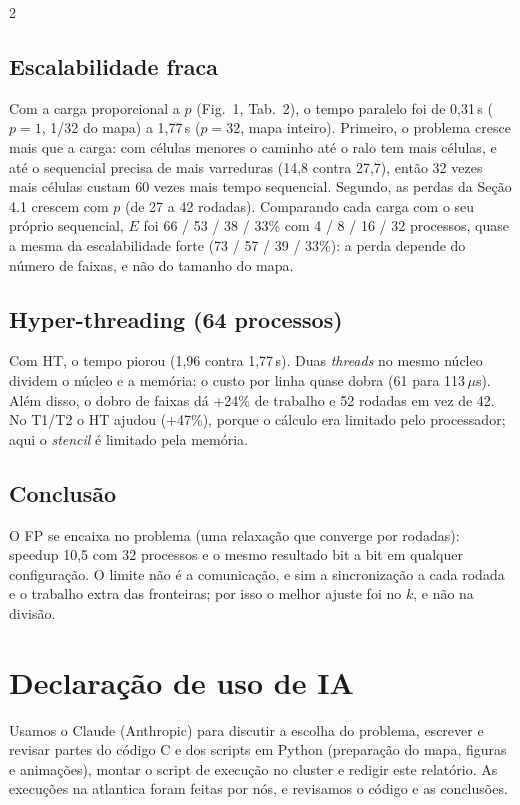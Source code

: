 \documentclass[9pt,a4paper]{extarticle}
\begin{document}
\begin{multicols}{2}
\subsection{Escalabilidade fraca}
Com a carga proporcional a $p$ (Fig.~1, Tab.~2), o tempo paralelo foi de 0,31\,s ($p=1$, 1/32 do mapa) a 1,77\,s ($p=32$, mapa inteiro). Primeiro, o problema cresce mais que a carga: com células menores o caminho até o ralo tem mais células, e até o sequencial precisa de mais varreduras (14,8 contra 27,7), então 32 vezes mais células custam 60 vezes mais tempo sequencial. Segundo, as perdas da Seção 4.1 crescem com $p$ (de 27 a 42 rodadas). Comparando cada carga com o seu próprio sequencial, $E$ foi 66 / 53 / 38 / 33\% com 4 / 8 / 16 / 32 processos, quase a mesma da escalabilidade forte (73 / 57 / 39 / 33\%): a perda depende do número de faixas, e não do tamanho do mapa.

\subsection{Hyper-threading (64 processos)}
Com HT, o tempo piorou (1,96 contra 1,77\,s). Duas \emph{threads} no mesmo núcleo dividem o núcleo e a memória: o custo por linha quase dobra (61 para 113\,$\mu$s). Além disso, o dobro de faixas dá +24\% de trabalho e 52 rodadas em vez de 42. No T1/T2 o HT ajudou (+47\%), porque o cálculo era limitado pelo processador; aqui o \emph{stencil} é limitado pela memória.

\subsection{Conclusão}
O FP se encaixa no problema (uma relaxação que converge por rodadas): speedup 10,5 com 32 processos e o mesmo resultado bit a bit em qualquer configuração. O limite não é a comunicação, e sim a sincronização a cada rodada e o trabalho extra das fronteiras; por isso o melhor ajuste foi no $k$, e não na divisão.

\section{Declaração de uso de IA}
Usamos o Claude (Anthropic) para discutir a escolha do problema, escrever e revisar partes do código C e dos scripts em Python (preparação do mapa, figuras e animações), montar o script de execução no cluster e redigir este relatório. As execuções na atlantica foram feitas por nós, e revisamos o código e as conclusões.
\end{multicols}
\end{document}
